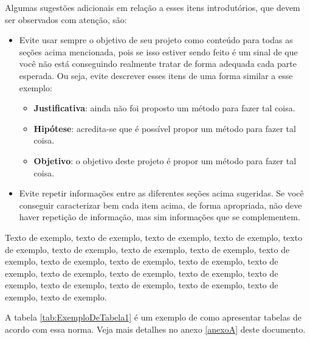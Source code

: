 \documentclass[
	12pt,				%
	oneside,			%
	a4paper,			%
	english,			%
	brazil				%
	]{abntex2ppgsi}
\begin{document}
Algumas sugestões adicionais em relação a esses itens introdutórios, que devem ser observados com atenção, são:
\begin{itemize}
	\item Evite usar sempre o objetivo de seu projeto como conteúdo para todas as seções acima mencionada, pois se isso estiver sendo feito é um sinal de que você não está conseguindo realmente tratar de forma adequada cada parte esperada. Ou seja, evite descrever esses itens de uma forma similar a esse exemplo:
	\begin{itemize}
		\item \textbf{Justificativa}: ainda não foi proposto um método para fazer tal coisa.
		\item \textbf{Hipótese}: acredita-se que é possível propor um método para fazer tal coisa.
		\item \textbf{Objetivo}: o objetivo deste projeto é propor um método para fazer tal coisa.
	\end{itemize}
	\item Evite repetir informações entre as diferentes seções acima sugeridas. Se você conseguir caracterizar bem cada item acima, de forma apropriada, não deve haver repetição de informação, mas sim informações que se complementem.
\end{itemize}





Texto de exemplo, texto de exemplo, texto de exemplo, texto de exemplo, texto de exemplo, texto de exemplo, texto de exemplo, texto de exemplo, texto de exemplo, texto de exemplo, texto de exemplo, texto de exemplo, texto de exemplo, texto de exemplo, texto de exemplo, texto de exemplo, texto de exemplo, texto de exemplo, texto de exemplo, texto de exemplo, texto de exemplo, texto de exemplo.  

A tabela \ref{tab:ExemploDeTabela1} é um exemplo de como apresentar tabelas de acordo com essa norma. Veja mais detalhes no anexo \ref{anexoA} deste documento.
\end{document}
